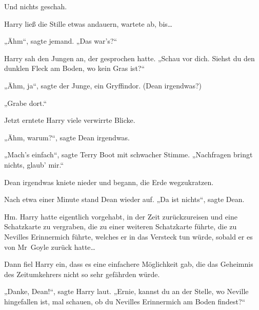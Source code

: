 Und nichts geschah.

Harry ließ die Stille etwas andauern, wartete ab, bis…

„Ähm“, sagte jemand. „Das war’s?“

Harry sah den Jungen an, der gesprochen hatte. „Schau vor dich. Siehst du den dunklen Fleck am Boden, wo kein Gras ist?“

„Ähm, ja“, sagte der Junge, ein Gryffindor. (Dean irgendwas?)

„Grabe dort.“

Jetzt erntete Harry viele verwirrte Blicke.

„Ähm, warum?“, sagte Dean irgendwas.

„Mach’s einfach“, sagte Terry Boot mit schwacher Stimme. „Nachfragen bringt nichts, glaub’ mir.“

Dean irgendwas kniete nieder und begann, die Erde wegzukratzen.

Nach etwa einer Minute stand Dean wieder auf. „Da ist nichts“, sagte Dean.

Hm. Harry hatte eigentlich vorgehabt, in der Zeit zurückzureisen und eine Schatzkarte zu vergraben, die zu einer weiteren Schatzkarte führte, die zu Nevilles Erinnermich führte, welches er in das Versteck tun würde, sobald er es von Mr~Goyle zurück hatte…

Dann fiel Harry ein, dass es eine einfachere Möglichkeit gab, die das Geheimnis des Zeitumkehrers nicht so sehr gefährden würde.

„Danke, Dean!“, sagte Harry laut. „Ernie, kannst du an der Stelle, wo Neville hingefallen ist, mal schauen, ob du Nevilles Erinnermich am Boden findest?“

